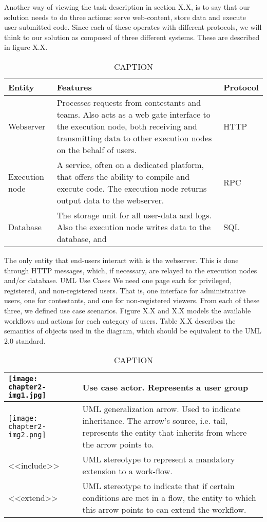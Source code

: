 Another way of viewing the task description in section X.X, is to say
that our solution needs to do three actions: serve web-content, store
data and execute user-submitted code. Since each of these operates with
different protocols, we will think to our solution as composed of three
different systems. These are described in figure X.X.
\begin{table}
\caption{CAPTION}
\tablehead{}
\begin{supertabular}{|m{0.2\textwidth}|m{0.6\textwidth}|m{0.2\textwidth}|}
\hline
Entity &
Features &
Protocol\\\hline
Webserver &
Processes requests from contestants and teams. Also acts as a web gate
interface to the execution node, both receiving and transmitting data
to other execution nodes on the behalf of users. &
HTTP\\\hline
Execution node &
A service, often on a dedicated platform, that offers the ability to
compile and execute code. The execution node returns output data to the
webserver. &
RPC\\\hline
Database &
The storage unit for all user{}-data and logs. Also the execution node
writes data to the database, and  &
SQL\\\hline
\end{supertabular}
\end{table}


The only entity that end-users interact with is the webserver. This is
done through HTTP messages, which, if necessary, are relayed to the
execution nodes and/or database. 
UML Use Cases
We need one page each for privileged, registered, and non-registered
users. That is, one interface for administrative users, one for
contestants, and one for non-registered viewers. From each of these
three, we defined use case scenarios. Figure X.X and X.X models the
available workflows and actions for each category of users. Table X.X
describes the semantics of objects used in the diagram, which should be
equivalent to the UML 2.0 standard.
\begin{table}
\caption{CAPTION}
\tablehead{}
\begin{supertabular}{|m{0.33\textwidth}|m{0.66\textwidth}|}
\hline
	\texttt{[image: chapter2-img1.jpg]}  &
Use case actor. Represents a user group\\\hline
	\texttt{[image: chapter2-img2.png]}  &
UML generalization arrow. Used to indicate inheritance. The
arrow's source, i.e. tail, represents the entity that
inherits from where the arrow points to.\\\hline
{\textless}{\textless}include{\textgreater}{\textgreater} &
UML stereotype to represent a mandatory extension to a
work{}-flow.\\\hline
{\textless}{\textless}extend{\textgreater}{\textgreater} &
UML stereotype to indicate that if certain conditions are met in a flow,
the entity to which this arrow points to can extend the
workflow.\\\hline
\end{supertabular}
\end{table}

